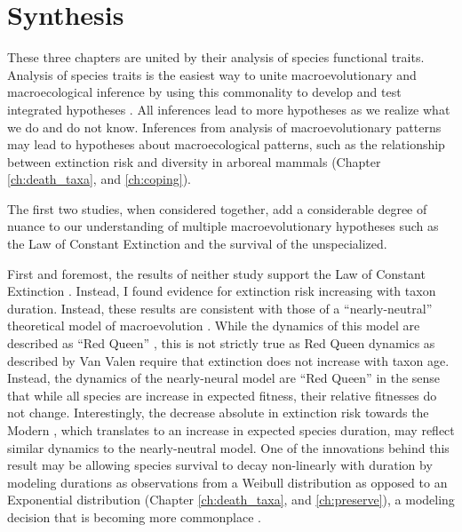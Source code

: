 \section{Synthesis}

These three chapters are united by their analysis of species functional traits. Analysis of species traits is the easiest way to unite macroevolutionary and macroecological inference by using this commonality to develop and test integrated hypotheses \citep{Mcgill2006,Weber2017}. All inferences lead to more hypotheses as we realize what we do and do not know. Inferences from analysis of macroevolutionary patterns may lead to hypotheses about macroecological patterns, such as the relationship between extinction risk and diversity in arboreal mammals (Chapter \ref{ch:death_taxa}, and \ref{ch:coping}).

The first two studies, when considered together, add a considerable degree of nuance to our understanding of multiple macroevolutionary hypotheses such as the Law of Constant Extinction and the survival of the unspecialized.

First and foremost, the results of neither study support the Law of Constant Extinction \citep{VanValen1973}. Instead, I found evidence for extinction risk increasing with taxon duration. Instead, these results are consistent with those of a ``nearly-neutral'' theoretical model of macroevolution \citep{Rosindell2015a}. While the dynamics of this model are described as ``Red Queen'' \citep{Rosindell2015a}, this is not strictly true as Red Queen dynamics as described by Van Valen \citep{VanValen1973} require that extinction does not increase with taxon age. Instead, the dynamics of the nearly-neural model are ``Red Queen'' in the sense that while all species are increase in expected fitness, their relative fitnesses do not change. Interestingly, the decrease absolute in extinction risk towards the Modern \citep{Raup1982a,Foote2003}, which translates to an increase in expected species duration, may reflect similar dynamics to the nearly-neutral model. One of the innovations behind this result may be allowing species survival to decay non-linearly with duration by modeling durations as observations from a Weibull distribution as opposed to an Exponential distribution (Chapter \ref{ch:death_taxa}, and \ref{ch:preserve}), a modeling decision that is becoming more commonplace \citep{Crampton2016a,Ezard2012b}.


